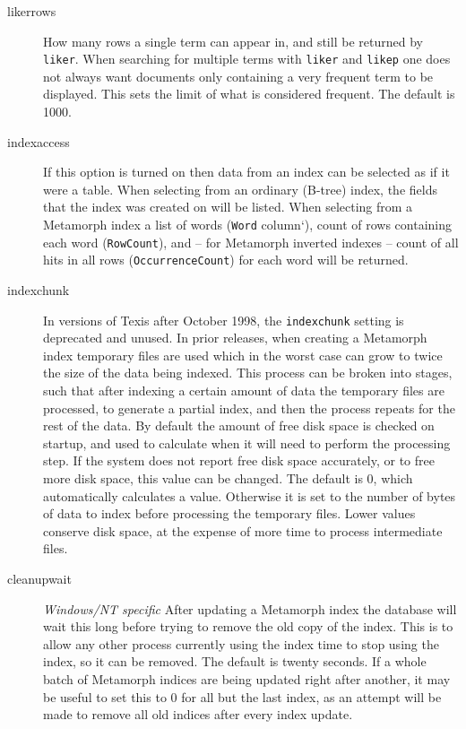 \begin{description}
\item[likerrows] How many rows a single term can appear in, and still be
returned by \verb`liker`.  When searching for multiple terms with \verb`liker`
and \verb`likep` one does not always want documents only containing a
very frequent term to be displayed.  This sets the limit of what is
considered frequent.  The default is 1000.

\item[indexaccess] If this option is turned on then data from an index
can be selected as if it were a table.  When selecting from an
ordinary (B-tree) index, the fields that the index was created on will
be listed.  When selecting from a Metamorph index a list of words
(\verb`Word` column`), count of rows containing each word
(\verb`RowCount`), and -- for Metamorph inverted indexes -- count of
all hits in all rows (\verb`OccurrenceCount`) for each word will be
returned.

\item[indexchunk] In versions of Texis after October 1998, the
\verb`indexchunk` setting is deprecated and unused.  In prior releases,
when creating a Metamorph index temporary files are
used which in the worst case can grow to twice the size of the data
being indexed.  This process can be broken into stages, such that
after indexing a certain amount of data the temporary files are
processed, to generate a partial index, and then the process repeats
for the rest of the data.  By default the amount of free disk space is
checked on startup, and used to calculate when it will need to perform
the processing step.  If the system does not report free disk space
accurately, or to free more disk space, this value can be changed.
The default is 0, which automatically calculates a value.  Otherwise
it is set to the number of bytes of data to index before processing
the temporary files.  Lower values conserve disk space, at the expense
of more time to process intermediate files.

\item[cleanupwait] {\em Windows/NT specific} After updating a
Metamorph index the database will wait this long before trying to
remove the old copy of the index.  This is to allow any other process
currently using the index time to stop using the index, so it can be
removed.  The default is twenty seconds.  If a whole batch of
Metamorph indices are being updated right after another, it may be
useful to set this to 0 for all but the last index, as an attempt will
be made to remove all old indices after every index update.


\end{description}
